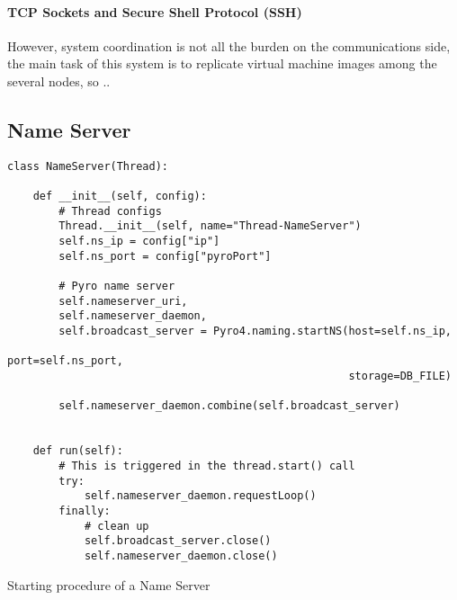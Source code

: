 \paragraph{TCP Sockets and Secure Shell Protocol (SSH)}
\label{par:rep_tcp_sockets}
However, system coordination is not all the burden on the communications side, the main task of this system is to replicate virtual machine images among the several nodes, so ..


\subsection{Name Server}
\label{sub:rep_name_server}



\begin{listing}[h!]
\begin{verbatim}
class NameServer(Thread):

	def __init__(self, config):
		# Thread configs
        Thread.__init__(self, name="Thread-NameServer")
        self.ns_ip = config["ip"]
        self.ns_port = config["pyroPort"]

        # Pyro name server
        self.nameserver_uri, 
        self.nameserver_daemon, 
        self.broadcast_server = Pyro4.naming.startNS(host=self.ns_ip,
                                                     port=self.ns_port,
                                                     storage=DB_FILE)

        self.nameserver_daemon.combine(self.broadcast_server)


	def run(self):
        # This is triggered in the thread.start() call
        try:
            self.nameserver_daemon.requestLoop()
        finally:
            # clean up
            self.broadcast_server.close()
            self.nameserver_daemon.close()
\end{verbatim}
\caption{Starting procedure of a Name Server}
\label{listing:icbd_nameserver}
\end{listing}



